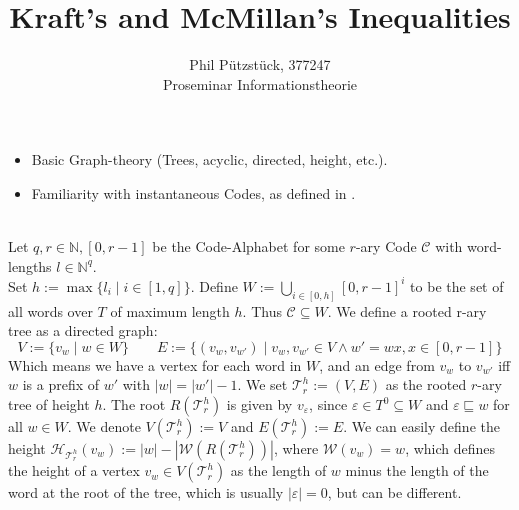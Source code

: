 \documentclass[12pt]{article}
\newcommand{\T}[0]{{\mathcal{T}_r^h}}
\newenvironment{statement2}[2]{\begin{trivlist}
\item[\hskip \labelsep {\bfseries #1}\hskip \labelsep {\bfseries #2}]}{\end{trivlist}}
\newenvironment{statement3}[3]{\begin{trivlist}
\item[\hskip \labelsep {\bfseries #1}\hskip \labelsep {\bfseries #2} {#3}\textbf{.}]}{\end{trivlist}}
\begin{document}
\title{Kraft's and McMillan's Inequalities}
\author{Phil Pützstück, 377247\\
Proseminar Informationstheorie}

\maketitle
\begin{statement2}{(1.0)}{Assumptions} \strut
    \begin{itemize}
        \item Basic Graph-theory (Trees, acyclic, directed, height, etc.).
        \item Familiarity with instantaneous Codes, as defined in \cite{ICT}.
    \end{itemize}
\end{statement2}

\begin{statement3}{(1.1)}{Definition}{(r-ary Trees from r-ary Codes)}\strut\\[2pt]
    Let $q,r \in \mathbb{N}, [0,r-1]$ be the Code-Alphabet for some $r$-ary Code $\mathcal{C}$ with word-lengths
    $l \in \mathbb{N}^q$.\\
    Set $h := \max\{l_i \mid i \in [1,q]\}$.
    Define $W := \bigcup_{i \in [0,h]} [0,r-1]^i$ to be the set of all words over $T$ of maximum length $h$. Thus
    $\mathcal{C} \subseteq W$. We define a rooted r-ary tree as a directed graph:
    $$
        V := \{v_w \mid w \in W\}\qquad E := \{(v_w, v_{w'}) \mid v_w,v_{w'} \in V \land w' = wx, x \in [0,r-1]\}
    $$
    Which means we have a vertex for each word in $W$, and an edge from $v_w$ to $v_{w'}$ iff $w$ is a prefix of $w'$
    with $|w| = |w'|-1$.
    We set $\T := (V,E)$ as the rooted $r$-ary tree of height $h$. The root $R(\T)$ is given by $v_\varepsilon$,
    since $\varepsilon \in T^0 \subseteq W$ and $\varepsilon \sqsubseteq w$ for all $w \in W$.
    We denote $V(\T) := V$ and $E(\T) := E$.
    We can easily define the height $\mathcal{H}_{\T}(v_w) := |w| - |\mathcal{W}(R(\T))|$, where
    $\mathcal{W}(v_w) = w$,
    which defines the height of a vertex $v_w \in V(\T)$ as the length of $w$ minus the length of the word at
    the root of the tree, which is usually $|\varepsilon| = 0$, but can be different.
\end{statement3}
\end{document}
